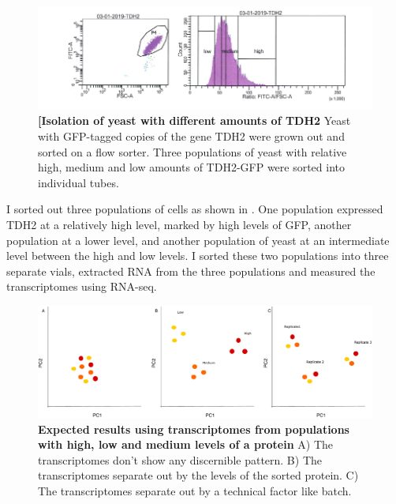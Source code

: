 \begin{figure}[t!]  
    \centering
    \includegraphics[width=\linewidth]{figures/intro/intro_tdh2_facs.png}
    \caption[Isolation of yeast with different amounts of TDH2]{%
        \textbf{[Isolation of yeast with different amounts of TDH2}
        Yeast with GFP-tagged copies of the gene TDH2 were grown out and sorted on a flow sorter. Three populations of yeast with relative high, medium and low amounts of TDH2-GFP were sorted into individual tubes.
    }
    \label{fig:intro3}
\end{figure}

I sorted out three populations of cells as shown in . One population expressed TDH2 at a relatively high level, marked by high levels of GFP, another population at a lower level, and another population of yeast at an intermediate level between the high and low levels.  I sorted these two populations into three separate vials, extracted RNA from the three populations and measured the transcriptomes using RNA-seq.

\begin{figure}[t!]  
    \centering
    \includegraphics[width=\linewidth, scale=0.5]{figures/intro/intro_clustering_expectedresults.pdf}
    \caption[Expected results using transcriptomes from populations with high, low and medium levels of a protein]{%
        \textbf{Expected results using transcriptomes from populations with high, low and medium levels of a protein}
        A) The transcriptomes don't show any discernible pattern. B) The transcriptomes separate out by the levels of the sorted protein. C) The transcriptomes separate out by a technical factor like batch.
    }
    \label{fig:intro4}
\end{figure}

